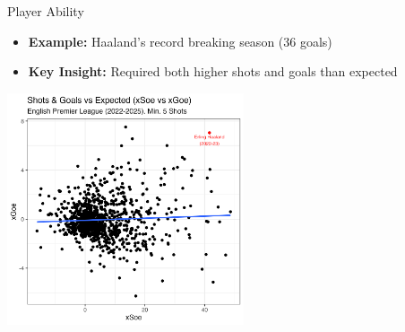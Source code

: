 \documentclass{beamer}
\begin{document}
\begin{frame}{Player Ability}
\begin{itemize}
\item \textbf{Example:} Haaland's record breaking season (36 goals)
\item \textbf{Key Insight:} Required both higher shots and goals than expected
\end{itemize}

\centering
\includegraphics[width=2.75in]{figures/xseoe_vs_xgoe.png}
\end{frame}
\end{document}
